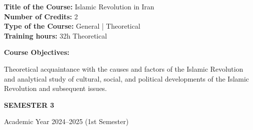 \documentclass[12pt,a4paper]{article}
\begin{document}
\par\vspace{14pt}
\nopagebreak
\textbf{Title of the Course:} Islamic Revolution in Iran\\
\textbf{Number of Credits:} 2\\
\textbf{Type of the Course:} General | Theoretical\\
\textbf{Training hours:} 32h Theoretical\par\vspace{4pt}
\textbf{Course Objectives:}\par\vspace{2pt}
Theoretical acquaintance with the causes and factors of the Islamic Revolution and analytical study
of cultural, social, and political developments of the Islamic Revolution and subsequent issues.\par\vspace{4pt}

\newpage
\vspace*{\fill}
\begin{center}
  {\fontsize{28pt}{34pt}\selectfont \textbf{SEMESTER 3}}\par\vspace{12pt}
  {\fontsize{13pt}{17pt}\selectfont Academic Year 2024–2025 (1st Semester)}
\end{center}
\vspace*{\fill}
\end{document}

